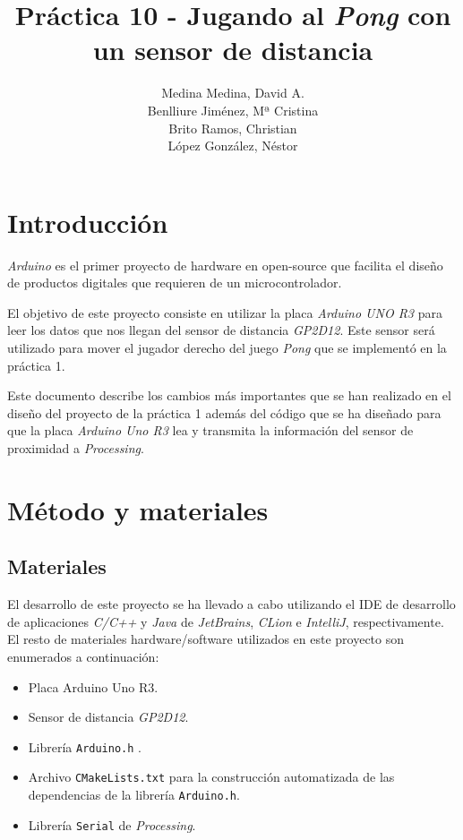 \documentclass[10pt,a4paper]{report}
\author{Medina Medina, David A.\\
Benlliure Jiménez, Mª Cristina\\
Brito Ramos, Christian\\
López González, Néstor}
\title{Práctica 10 - Jugando al \textit{Pong} con un sensor de distancia}
\begin{document}
	\maketitle
	\tableofcontents
	
	\chapter{Introducción}
	\textit{Arduino} es el primer proyecto de hardware en open-source que facilita el diseño de productos digitales que requieren de un microcontrolador.
	
	El objetivo de este proyecto \cite{repositorio-github} consiste en utilizar la placa \textit{Arduino UNO R3} para leer los datos que nos llegan del sensor de distancia \textit{GP2D12}. Este sensor será utilizado para mover el jugador derecho del juego \textit{Pong} que se implementó en la práctica 1.
	
	Este documento describe los cambios más importantes que se han realizado en el diseño del proyecto de la práctica 1 además del código que se ha diseñado para que la placa \textit{Arduino Uno R3} lea y transmita la información del sensor de proximidad a \textit{Processing}.
	
	
	\chapter{Método y materiales}
	\section{Materiales}
	El desarrollo de este proyecto se ha llevado a cabo utilizando el IDE de desarrollo de aplicaciones \textit{C/C++} y \textit{Java} de \textit{JetBrains}, \textit{CLion} e \textit{IntelliJ}, respectivamente. El resto de materiales hardware/software utilizados en este proyecto son enumerados a continuación:
	\begin{itemize}
		\item Placa Arduino Uno R3.
		\item Sensor de distancia \textit{GP2D12}.
		\item Librería \texttt{Arduino.h} \cite{arduino-reference}.
		\item Archivo \texttt{CMakeLists.txt} para la construcción automatizada de las dependencias de la librería \texttt{Arduino.h}.
		\item Librería \texttt{Serial} de \textit{Processing}.
	\end{itemize}
\end{document}
